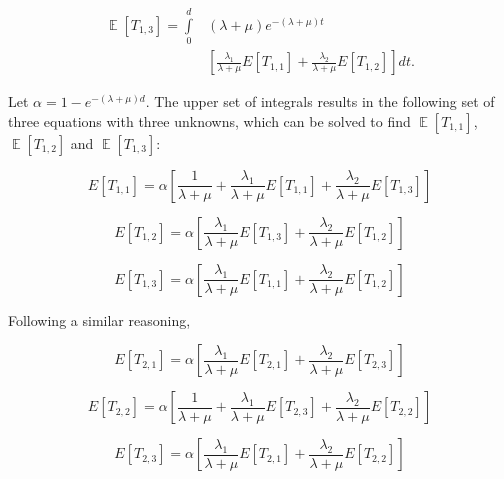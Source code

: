 \documentclass[preprint,12pt]{elsarticle}
\theoremstyle{definition}
\theoremstyle{plain}
\theoremstyle{remark}
\newcommand{\e}{e}
\DeclareMathOperator{\E}{\mathbb{E}}
\begin{document}
    \begin{equation}\label{eq:ET13}
    \begin{split}
    \E[T_{1,3}] = \int\limits_{0}^{d} & (\lambda+\mu)\e^{-(\lambda+\mu)t} \\
    & \left[\frac{\lambda_{1}}{\lambda+\mu}E[T_{1,1}] + \frac{\lambda_{2}}{\lambda+\mu}E[T_{1,2}]\right] dt.
    \end{split}
    \end{equation}


   Let $\alpha = 1 - \e^{-(\lambda + \mu)d}$. The upper set of integrals results in the following set of three equations with three unknowns, which can be solved to find $\E[T_{1,1}]$, $\E[T_{1,2}]$ and $\E[T_{1,3}]$:

    \begin{equation} \label{eq:ET11set}
    E[T_{1,1}] = \alpha\left[\frac{1}{\lambda + \mu} + \frac{\lambda_{1}}{\lambda + \mu} E[T_{1,1}] +  \frac{\lambda_{2}}{\lambda + \mu} E[T_{1,3}]\right]
    \end{equation}

    \begin{equation}\label{eq:ET12set}
    E[T_{1,2}] = \alpha\left[\frac{\lambda_{1}}{\lambda + \mu} E[T_{1,3}] +  \frac{\lambda_{2}}{\lambda + \mu} E[T_{1,2}] \right]
    \end{equation}

    \begin{equation}\label{eq:ET13set}
    E[T_{1,3}] = \alpha\left[\frac{\lambda_{1}}{\lambda + \mu}E[T_{1,1}] +  \frac{\lambda_{2}}{\lambda + \mu} E[T_{1,2}] \right]
    \end{equation}


    Following a similar reasoning,

    \begin{equation} \label{eq:ET21set}
    E[T_{2,1}] = \alpha\left[\frac{\lambda_{1}}{\lambda + \mu} E[T_{2,1}] +  \frac{\lambda_{2}}{\lambda + \mu} E[T_{2,3}]\right]
    \end{equation}

    \begin{equation} \label{eq:ET22set}
    E[T_{2,2}] = \alpha\left[\frac{1}{\lambda + \mu} + \frac{\lambda_{1}}{\lambda + \mu} E[T_{2,3}] +  \frac{\lambda_{2}}{\lambda + \mu} E[T_{2,2}] \right]
    \end{equation}

    \begin{equation} \label{eq:ET23set}
    E[T_{2,3}] = \alpha\left[\frac{\lambda_{1}}{\lambda + \mu}E[T_{2,1}] +  \frac{\lambda_{2}}{\lambda + \mu} E[T_{2,2}] \right]
    \end{equation}
\end{document}
